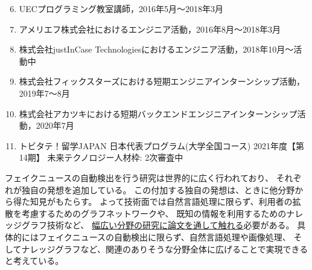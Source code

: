 \vspace{-3mm}
\begin{enumerate}
    \setcounter{enumi}{5}
    \setlength{\parskip}{0cm}
    \setlength{\itemsep}{0cm}
    \item UECプログラミング教室講師，2016年5月〜2018年3月\cite{uecprog} \label{enum:prog}
    \item アメリエフ株式会社におけるエンジニア活動，2016年8月〜2018年3月\cite{amelieff} \label{enum:amelieff}
    \item 株式会社justInCase Technologiesにおけるエンジニア活動，2018年10月〜活動中\cite{jic-tech} \label{enum:jict}
    \item 株式会社フィックスターズにおける短期エンジニアインターンシップ活動，2019年7〜8月 \label{enum:fixstars}
    \item 株式会社アカツキにおける短期バックエンドエンジニアインターンシップ活動，2020年7月 \label{enum:ak}
\end{enumerate}
\vspace{-3mm}
\begin{enumerate}
    \setcounter{enumi}{10}
    \setlength{\parskip}{0cm}
    \setlength{\itemsep}{0cm}
    \item トビタテ！留学JAPAN 日本代表プログラム(大学全国コース) 2021年度【第14期】
    未来テクノロジー人材枠: 2次審査中 \label{enum:tobitate}
\end{enumerate}

\noindent
{}
フェイクニュースの自動検出を行う研究は世界的に広く行われており、
それぞれが独自の発想を追加している。
この付加する独自の発想は、ときに他分野から得た知見がもたらす。
よって技術面では自然言語処理に限らず、利用者の拡散を考慮するためのグラフネットワークや、
既知の情報を利用するためのナレッジグラフ技術など、
\underline{幅広い分野の研究に論文を通して触れる}必要がある。
具体的にはフェイクニュースの自動検出に限らず、自然言語処理や画像処理、
そしてナレッジグラフなど、関連のありそうな分野全体に広げることで実現できると考えている。

